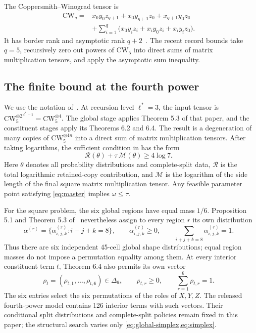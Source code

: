 \documentclass[11pt,reqno]{amsart}
\theoremstyle{definition}
\theoremstyle{remark}
\newcommand{\CW}{\mathrm{CW}}
\newcommand{\DeltaSix}{\Delta_{6}}
\begin{document}
The Coppersmith--Winograd tensor is
\begin{align*}
  \CW_q={}&x_0y_0z_{q+1}+x_0y_{q+1}z_0+x_{q+1}y_0z_0 \\
  &+\sum_{i=1}^{q}\bigl(x_0y_iz_i+x_iy_0z_i+x_iy_iz_0\bigr).
\end{align*}
It has border rank and asymptotic rank $q+2$~\cite{CoppersmithWinograd1990}.  The recent record bounds
take $q=5$, recursively zero out powers of $\CW_5$ into direct sums of matrix multiplication tensors,
and apply the asymptotic sum inequality.

\subsection{The finite bound at the fourth power}

We use the notation of~\cite[Sections 5--7]{MoreAsymmetry}.  At recursion level
$\ell^*=3$, the input tensor is $\CW_5^{\otimes 2^{\ell^*-1}}=\CW_5^{\otimes4}$.
The global stage applies Theorem 5.3 of that paper, and the constituent stages apply its Theorems 6.2
and 6.4.  The result is a degeneration of many copies of $\CW_5^{\otimes4n}$ into a direct sum of
matrix multiplication tensors.  After taking logarithms, the sufficient condition in
\cite[Equation (7)]{MoreAsymmetry} has the form
\begin{equation}\label{eq:master}
   \mathcal R(\theta)+\tau\,\mathcal M(\theta)\ge 4\log 7.
\end{equation}
Here $\theta$ denotes all probability distributions and complete-split data, $\mathcal R$ is the total
logarithmic retained-copy contribution, and $\mathcal M$ is the logarithm of the side length of the final
square matrix multiplication tensor.  Any feasible parameter point satisfying \cref{eq:master} implies
$\omega\le\tau$.

For the square problem, the six global regions have equal mass $1/6$.  Proposition 5.1 and Theorem 5.3
of~\cite{MoreAsymmetry} nevertheless assign to every region $r$ its own distribution
\begin{equation}\label{eq:global-simplex}
  \alpha^{(r)}=\{\alpha^{(r)}_{i,j,k}:i+j+k=8\},
  \qquad \alpha^{(r)}_{i,j,k}\ge0,
  \qquad \sum_{i+j+k=8}\alpha^{(r)}_{i,j,k}=1.
\end{equation}
Thus there are six independent 45-cell global shape distributions; equal region masses do not impose a
permutation equality among them.  At every interior constituent term $t$, Theorem 6.4 also permits its own
vector
\begin{equation}\label{eq:simplex}
  \rho_t=(\rho_{t,1},\ldots,\rho_{t,6})\in\DeltaSix,
  \qquad
  \rho_{t,r}\ge0,
  \qquad
  \sum_{r=1}^{6}\rho_{t,r}=1.
\end{equation}
The six entries select the six permutations of the roles of $X,Y,Z$.  The released fourth-power model
contains 126 interior terms with such vectors.  Their conditional split distributions and complete-split
policies remain fixed in this paper; the structural search varies only \cref{eq:global-simplex,eq:simplex}.
\end{document}
